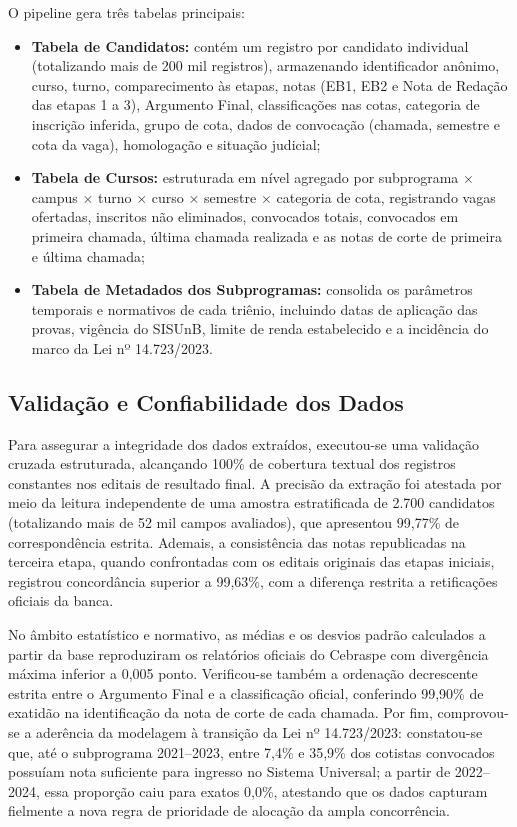 \documentclass[12pt]{article}
\begin{document}
O pipeline gera três tabelas principais:
\begin{itemize}
    \item \textbf{Tabela de Candidatos:} contém um registro por candidato individual (totalizando mais de 200 mil registros), armazenando identificador anônimo, curso, turno, comparecimento às etapas, notas (EB1, EB2 e Nota de Redação das etapas 1 a 3), Argumento Final, classificações nas cotas, categoria de inscrição inferida, grupo de cota, dados de convocação (chamada, semestre e cota da vaga), homologação e situação judicial;
    
    \item \textbf{Tabela de Cursos:} estruturada em nível agregado por subprograma $\times$ campus $\times$ turno $\times$ curso $\times$ semestre $\times$ categoria de cota, registrando vagas ofertadas, inscritos não eliminados, convocados totais, convocados em primeira chamada, última chamada realizada e as notas de corte de primeira e última chamada;
    
    \item \textbf{Tabela de Metadados dos Subprogramas:} consolida os parâmetros temporais e normativos de cada triênio, incluindo datas de aplicação das provas, vigência do SISUnB, limite de renda estabelecido e a incidência do marco da Lei nº 14.723/2023.
\end{itemize}

\subsection{Validação e Confiabilidade dos Dados}

Para assegurar a integridade dos dados extraídos, executou-se uma validação cruzada estruturada, alcançando 100\% de cobertura textual dos registros constantes nos editais de resultado final. A precisão da extração foi atestada por meio da leitura independente de uma amostra estratificada de 2.700 candidatos (totalizando mais de 52 mil campos avaliados), que apresentou 99,77\% de correspondência estrita. Ademais, a consistência das notas republicadas na terceira etapa, quando confrontadas com os editais originais das etapas iniciais, registrou concordância superior a 99,63\%, com a diferença restrita a retificações oficiais da banca.

No âmbito estatístico e normativo, as médias e os desvios padrão calculados a partir da base reproduziram os relatórios oficiais do Cebraspe com divergência máxima inferior a 0,005 ponto. Verificou-se também a ordenação decrescente estrita entre o Argumento Final e a classificação oficial, conferindo 99,90\% de exatidão na identificação da nota de corte de cada chamada. Por fim, comprovou-se a aderência da modelagem à transição da Lei nº 14.723/2023: constatou-se que, até o subprograma 2021--2023, entre 7,4\% e 35,9\% dos cotistas convocados possuíam nota suficiente para ingresso no Sistema Universal; a partir de 2022--2024, essa proporção caiu para exatos 0,0\%, atestando que os dados capturam fielmente a nova regra de prioridade de alocação da ampla concorrência.
\end{document}
